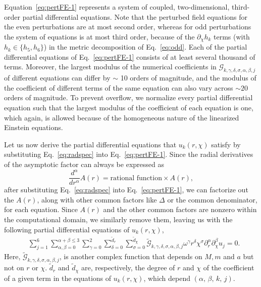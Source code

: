\documentclass[aps,prx,amsmath,floats,floatfix,twocolumn,
  superscriptaddress,nofootinbib,showpacs]{revtex4-1}
\begin{document}
Equation~\eqref{eq:pertFE-1} represents a system of coupled, two-dimensional, third-order partial differential equations. Note that the perturbed field equations for the even perturbations are at most second order, whereas for odd perturbations the system of equations is at most third order, because of the $\partial_\chi h_k$ terms (with $h_k \in \{h_5,h_6\}$) in the metric decomposition of Eq.~\eqref{eq:odd}.
Each of the partial differential equations of Eq.~\eqref{eq:pertFE-1} consists of at least several thousand of terms. 
Moreover, the largest modulus of the numerical coefficients in $\mathcal{G}_{k, \gamma, \delta, \sigma, \alpha, \beta, j}$ of different equations can differ by $\sim$ 10 orders of magnitude, and the modulus of the coefficient of different terms of the same equation can also vary across $\sim 20$ orders of magnitude. 
To prevent overflow, we normalize every partial differential equation such that the largest modulus of the coefficient of each equation is one, which again, is allowed because of the homogeneous nature of the linearized Einstein equations.

Let us now derive the partial differential equations that $u_k(r, \chi)$ satisfy by substituting Eq.~\eqref{eq:radspec} into Eq.~\eqref{eq:pertFE-1}. 
Since the radial derivatives of the asymptotic factor can always be expressed as 
\begin{equation}
\frac{d^{\alpha}}{d r^{\alpha}} A(r) = \text{rational function} \times A(r), 
\end{equation}
after substituting Eq.~\eqref{eq:radspec} into Eq.~\eqref{eq:pertFE-1}, we can factorize out the $A(r)$, along with other common factors like $\Delta$ or the common denominator, for each equation. 
Since $A(r)$ and the other common factors are nonzero within the computational domain, we similarly remove them, leaving us with the following partial differential equations of $u_k(r, \chi)$, 
\begin{equation}\label{eq:pertFE-1u}
\begin{split}
& \sum_{j=1}^{6} \sum_{\alpha, \beta = 0}^{\alpha + \beta \leq 3} \sum_{\gamma=0}^{2} \sum_{\delta=0}^{\tilde{d}_{r}} \sum_{\sigma=0}^{\tilde{d}_{\chi}} \tilde{\mathcal{G}}_{k, \gamma, \delta, \sigma, \alpha, \beta, j} \omega^\gamma r^{\delta} \chi^{\sigma} \partial_{r}^{\alpha} \partial_{\chi}^{\beta} u_j = 0. 
\end{split}
\end{equation}
Here, $\tilde{\mathcal{G}}_{k, \gamma, \delta, \sigma, \alpha, \beta, j}$, is another complex function that depends on $M, m$ and $a$ but not on $r$ or $\chi$. 
$\tilde{d}_r$ and $\tilde{d}_\chi$ are, respectively, the degree of $r$ and $\chi$ of the coefficient of a given term in the equations of $u_k(r, \chi)$, which depend $(\alpha,\, \beta, \, k, \, j)$. 
\end{document}
